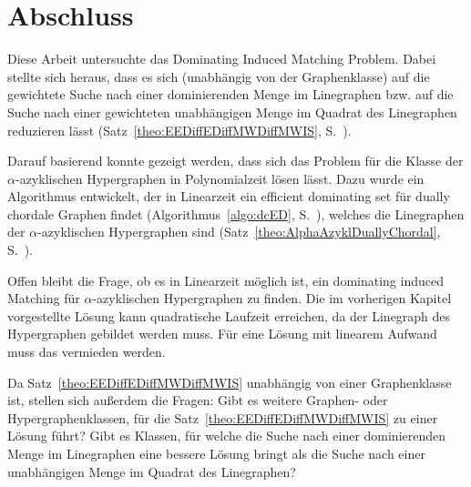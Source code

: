 \chapter{Abschluss}

Diese Arbeit untersuchte das Dominating Induced Matching Problem. Dabei stellte sich heraus, dass es sich (unabhängig von der Graphenklasse) auf die gewichtete Suche nach einer dominierenden Menge im Linegraphen bzw. auf die Suche nach einer gewichteten unabhängigen Menge im Quadrat des Linegraphen reduzieren lässt (Satz~\ref{theo:EEDiffEDiffMWDiffMWIS}, S.~\pageref{theo:EEDiffEDiffMWDiffMWIS}).

Darauf basierend konnte gezeigt werden, dass sich das Problem für die Klasse der $\alpha$-azyklischen Hypergraphen in Polynomialzeit lösen lässt. Dazu wurde ein Algorithmus entwickelt, der in Linearzeit ein efficient dominating set für dually chordale Graphen findet (Algorithmus~\ref{algo:dcED}, S.~\pageref{algo:dcED}), welches die Linegraphen der $\alpha$-azyklischen Hypergraphen sind (Satz~\ref{theo:AlphaAzyklDuallyChordal}, S.~\pageref{theo:AlphaAzyklDuallyChordal}).

Offen bleibt die Frage, ob es in Linearzeit möglich ist, ein dominating induced Matching für $\alpha$-azyklischen Hypergraphen zu finden. Die im vorherigen Kapitel vorgestellte Lösung kann quadratische Laufzeit erreichen, da der Linegraph des Hypergraphen gebildet werden muss. Für eine Lösung mit linearem Aufwand muss das vermieden werden.

Da Satz~\ref{theo:EEDiffEDiffMWDiffMWIS} unabhängig von einer Graphenklasse ist, stellen sich außerdem die Fragen: Gibt es weitere Graphen- oder Hypergraphenklassen, für die Satz~\ref{theo:EEDiffEDiffMWDiffMWIS} zu einer Lösung führt? Gibt es Klassen, für welche die Suche nach einer dominierenden Menge im Linegraphen eine bessere Lösung bringt als die Suche nach einer unabhängigen Menge im Quadrat des Linegraphen?